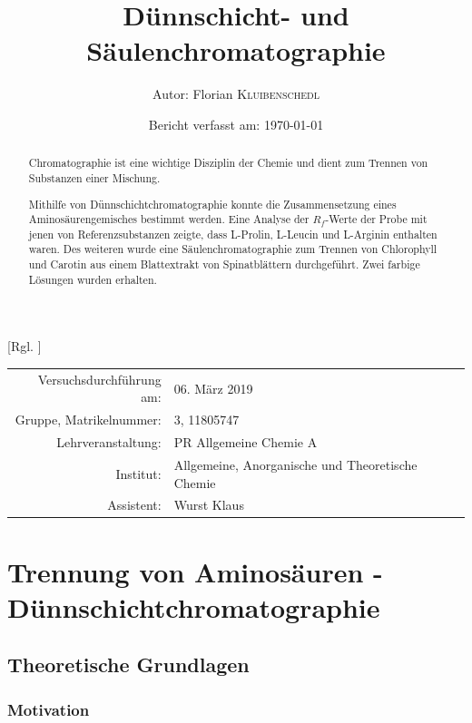 \documentclass{article}
\title{Dünnschicht- und Säulenchromatographie \cite{Versuchsvorschrift}} %
\author{Autor: Florian \textsc{Kluibenschedl}} %
\date{Bericht verfasst am: \today} %
\begin{document}
  [Rgl. ]{}{}
  
  \maketitle %
  
  \begin{center}
    \begin{tabular}{r p{4cm}}
      Versuchsdurchführung am: & 06. März 2019\\ %
      Gruppe, Matrikelnummer: & 3, 11805747 \\
      Lehrveranstaltung: & PR Allgemeine Chemie A \\
      Institut: & Allgemeine, Anorganische und Theoretische Chemie \\
      Assistent: & Wurst Klaus %
    \end{tabular}
  \end{center}


  \begin{abstract}
    Chromatographie ist eine wichtige Disziplin der Chemie und dient zum Trennen von Substanzen einer Mischung. 
    
    Mithilfe von Dünnschichtchromatographie konnte die Zusammensetzung eines Aminosäurengemisches bestimmt werden. Eine Analyse der $R_{f}$-Werte der Probe mit jenen von Referenzsubstanzen zeigte, dass L-Prolin, L-Leucin und L-Arginin enthalten waren. Des weiteren wurde eine Säulenchromatographie zum Trennen von Chlorophyll und Carotin aus einem Blattextrakt von Spinatblättern durchgeführt. Zwei farbige Lösungen wurden erhalten.
  \end{abstract}
  
  \pagebreak
  
  \section{Trennung von Aminosäuren - Dünnschichtchromatographie}
  
    \subsection{Theoretische Grundlagen}
  
      \subsubsection{Motivation} \label{sec:Motivation}
        
\end{document}

